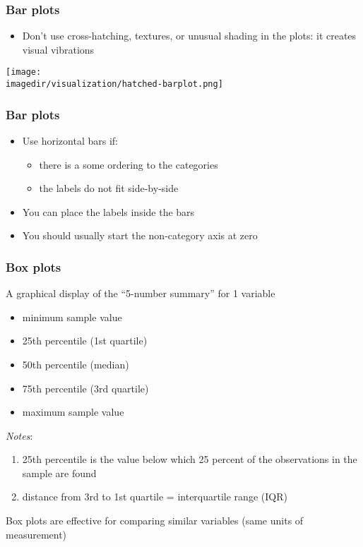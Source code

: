 \begin{frame}\frametitle{Bar plots}
	\begin{itemize}
		\item	Don't use cross-hatching, textures, or unusual shading in the plots: it creates visual vibrations 
	\end{itemize}
	\begin{center}
		\texttt{[image: \\imagedir/visualization/hatched-barplot.png]}
	\end{center}
\end{frame}

\begin{frame}\frametitle{Bar plots}
	\begin{itemize}
		\item	Use horizontal bars if: 
		\begin{itemize}
			\item	there is a some ordering to the categories 
			\item	the labels do not fit side-by-side\pause 
		\end{itemize}
	\end{itemize}
	\begin{itemize}
		\item	You can place the labels inside the bars\pause 
	\end{itemize}
	\begin{itemize}
		\item	You should usually start the non-category axis at zero 
	\end{itemize}
\end{frame}

\begin{frame}\frametitle{Box plots}
	
	A graphical display of the ``5-number summary'' for 1 variable 
	\begin{itemize}
		\item	minimum sample value 
		\item	25th percentile (1st quartile) 
		\item	50th percentile (median) 
		\item	75th percentile (3rd quartile) 
		\item	maximum sample value 
	\end{itemize}
	
	\emph{Notes}: 
	\begin{enumerate}
		\item	25th percentile is the value below which 25 percent of the observations in the sample are found 
		\item	distance from 3rd to 1st quartile = interquartile range (IQR) 
	\end{enumerate}
	
	Box plots are effective for comparing similar variables (same units of measurement)
\end{frame}

